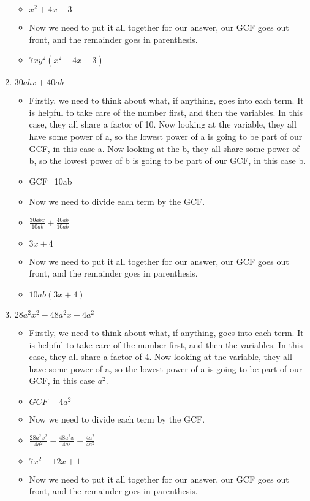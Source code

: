 \begin{enumerate}
\begin{itemize}
  \item [] $x^{2}+4x-3$
  \item Now we need to put it all together for our answer, our GCF goes out front, and the remainder goes in parenthesis.
  \item $7xy^{2}(x^{2}+4x-3)$
  \end{itemize}
\item $30abx + 40ab$
  \begin{itemize}
  \item Firstly, we need to think about what, if anything, goes into each term. It is helpful to take care of the number first, and then the variables. In this case, they all share a factor of 10. Now looking at the variable, they all have some power of a, so the lowest power of a is going to be part of our GCF, in this case a. Now looking at the b, they all share some power of b, so the lowest power of b is going to be part of our GCF, in this case b.
  \item [] GCF=10ab
  \item Now we need to divide each term by the GCF.
  \item [] {\Large $\frac{30abx}{10ab} + \frac{40ab}{10ab}$}
  \item [] $3x+4$
  \item Now we need to put it all together for our answer, our GCF goes out front, and the remainder goes in parenthesis.
  \item $10ab(3x+4)$ 
  \end{itemize}
\item $28a^{2}x^{2} - 48a^{2}x + 4a^{2}$
  \begin{itemize}
  \item Firstly, we need to think about what, if anything, goes into each term. It is helpful to take care of the number first, and then the variables. In this case, they all share a factor of 4. Now looking at the variable, they all have some power of a, so the lowest power of a is going to be part of our GCF, in this case $a^{2}$.
  \item [] $GCF=4a^{2}$
  \item Now we need to divide each term by the GCF.
  \item [] {\Large $\frac{28a^{2}x^{2}}{4a^{2}} - \frac{48a^{2}x}{4a^{2}} + \frac{4a^{2}}{4a^{2}}$}
  \item [] $7x^{2}-12x+1$
  \item Now we need to put it all together for our answer, our GCF goes out front, and the remainder goes in parenthesis.

\end{itemize}
\end{enumerate}
